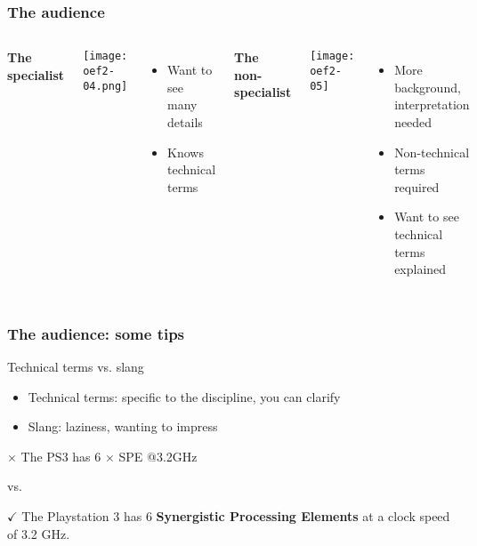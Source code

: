 \documentclass[aspectratio=169]{beamer}
\begin{document}
\begin{frame}
  \frametitle{The audience}
  
  \begin{columns}[c]
    
    \centering
    
    \textbf{The specialist}
    
    \texttt{[image: oef2-04.png]}
    
    \begin{itemize}
      \item Want to see many details
      \item Knows technical terms
    \end{itemize}
    
    
    \centering
    
    \textbf{The non-specialist}
    
    \texttt{[image: oef2-05]}
    
    \begin{itemize}
      \item More background, interpretation needed
      \item Non-technical terms required
      \item Want to see technical terms explained
    \end{itemize}
  \end{columns}
\end{frame}

\begin{frame}
  \frametitle{The audience: some tips}
  
  Technical terms vs. slang
  
  \begin{itemize}
    \item Technical terms: specific to the discipline, you can clarify
    \item Slang: laziness, wanting to impress
  \end{itemize}
  
  \vfill
  
  \centering
  
  \textcolor{hgorange}{$\times$ The PS3 has 6 $\times$ SPE @3.2GHz}
  
  vs.
  
  \textcolor{hgdarkgreen}{$\checkmark$ The Playstation 3 has 6 \textbf{Synergistic Processing Elements} at a clock speed of 3.2 GHz.}
\end{frame}
\end{document}

